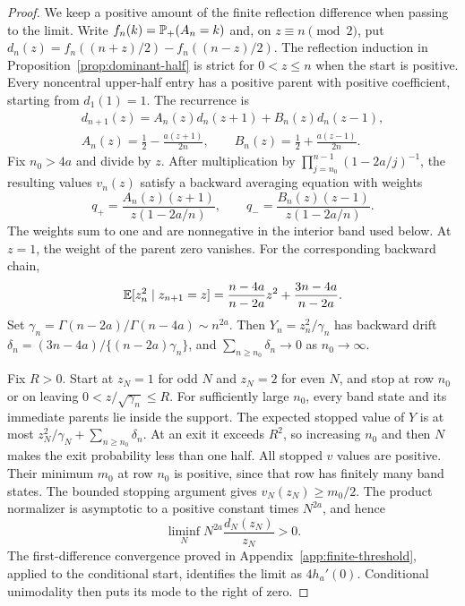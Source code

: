 \begin{proof}
We keep a positive amount of the finite reflection difference when
passing to the limit. Write $f_n(k)=\mathbb{P}_+(A_n=k)$ and, on
$z\equiv n\pmod2$, put
$d_n(z)=f_n((n+z)/2)-f_n((n-z)/2)$.
The reflection induction in Proposition~\ref{prop:dominant-half}
is strict for $0<z\le n$ when the start is positive. Every noncentral
upper-half entry has a positive parent with positive coefficient,
starting from $d_1(1)=1$.
The recurrence is
\begin{gather*}
 d_{n+1}(z)=A_n(z)d_n(z+1)+B_n(z)d_n(z-1),\\
 A_n(z)=\frac12-\frac{a(z+1)}{2n},\qquad
 B_n(z)=\frac12+\frac{a(z-1)}{2n}.
\end{gather*}
Fix $n_0>4a$ and divide by $z$. After multiplication by
$\prod_{j=n_0}^{n-1}(1-2a/j)^{-1}$, the resulting values $v_n(z)$
satisfy a backward averaging equation with weights
\[
 q_+=\frac{A_n(z)(z+1)}{z(1-2a/n)},\qquad
 q_-=\frac{B_n(z)(z-1)}{z(1-2a/n)}.
\]
The weights sum to one and are nonnegative in the interior band
used below. At $z=1$, the weight of the parent zero vanishes.
For the corresponding backward chain,
\[
 \mathbb{E}[z_n^2\mid z_{n+1}=z]
 =\frac{n-4a}{n-2a}z^2+\frac{3n-4a}{n-2a}.
\]
Set $\gamma_n=\Gamma(n-2a)/\Gamma(n-4a)\sim n^{2a}$.
Then $Y_n=z_n^2/\gamma_n$ has backward drift
$\delta_n=(3n-4a)/\{(n-2a)\gamma_n\}$, and
$\sum_{n\ge n_0}\delta_n\to0$ as $n_0\to\infty$.

Fix $R>0$. Start at $z_N=1$ for odd $N$ and $z_N=2$ for even $N$,
and stop at row $n_0$ or on leaving $0<z/\sqrt{\gamma_n}\le R$.
For sufficiently large $n_0$, every band state and its immediate
parents lie inside the support. The expected stopped value of $Y$
is at most $z_N^2/\gamma_N+\sum_{n\ge n_0}\delta_n$.
At an exit it exceeds $R^2$, so increasing $n_0$ and then $N$
makes the exit probability less than one half.
All stopped $v$ values are positive. Their minimum $m_0$ at row
$n_0$ is positive, since that row has finitely many band states.
The bounded stopping argument gives $v_N(z_N)\ge m_0/2$.
The product normalizer is asymptotic to a positive constant times
$N^{2a}$, and hence
\[
 \liminf_N N^{2a}\frac{d_N(z_N)}{z_N}>0.
\]
The first-difference convergence proved in
Appendix~\ref{app:finite-threshold}, applied to the conditional start,
identifies the limit as $4h_a'(0)$. Conditional unimodality
then puts its mode to the right of zero.
\end{proof}
